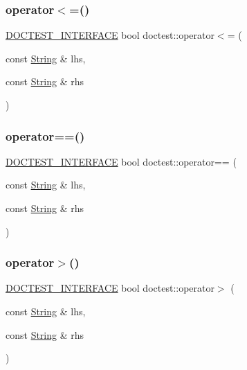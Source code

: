 \mbox{\label{namespacedoctest_a27c6c308e814ad9384499bafc03f9e39}} 
\subsubsection{\texorpdfstring{operator$<$=()}{operator<=()}}
{\footnotesize\ttfamily \hyperlink{doctest_8h_a9c16ffc635ec47f07797d21ede26b1a5}{D\+O\+C\+T\+E\+S\+T\+\_\+\+I\+N\+T\+E\+R\+F\+A\+CE} bool doctest\+::operator$<$= (\begin{DoxyParamCaption}\item[{const \hyperlink{classdoctest_1_1String}{String} \&}]{lhs,  }\item[{const \hyperlink{classdoctest_1_1String}{String} \&}]{rhs }\end{DoxyParamCaption})}

\mbox{\label{namespacedoctest_ae332e5e775f83a532884303780f79f9f}} 
\subsubsection{\texorpdfstring{operator==()}{operator==()}}
{\footnotesize\ttfamily \hyperlink{doctest_8h_a9c16ffc635ec47f07797d21ede26b1a5}{D\+O\+C\+T\+E\+S\+T\+\_\+\+I\+N\+T\+E\+R\+F\+A\+CE} bool doctest\+::operator== (\begin{DoxyParamCaption}\item[{const \hyperlink{classdoctest_1_1String}{String} \&}]{lhs,  }\item[{const \hyperlink{classdoctest_1_1String}{String} \&}]{rhs }\end{DoxyParamCaption})}

\mbox{\label{namespacedoctest_acef5990b03a973c74ff2dd6cfc112913}} 
\subsubsection{\texorpdfstring{operator$>$()}{operator>()}}
{\footnotesize\ttfamily \hyperlink{doctest_8h_a9c16ffc635ec47f07797d21ede26b1a5}{D\+O\+C\+T\+E\+S\+T\+\_\+\+I\+N\+T\+E\+R\+F\+A\+CE} bool doctest\+::operator$>$ (\begin{DoxyParamCaption}\item[{const \hyperlink{classdoctest_1_1String}{String} \&}]{lhs,  }\item[{const \hyperlink{classdoctest_1_1String}{String} \&}]{rhs }\end{DoxyParamCaption})}

